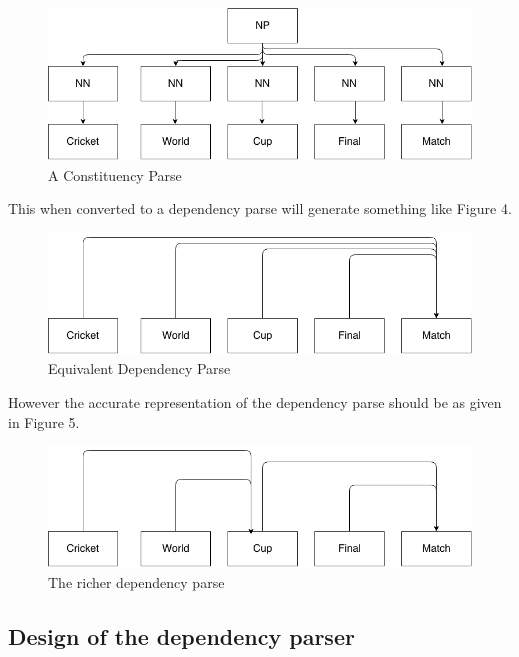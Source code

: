 \begin{enumerate}
\begin{figure}[t]
\centering
\includegraphics[scale=0.4]{gfx/parse.png}
\caption{A Constituency Parse }
\end{figure}
\vspace{8mm}
This when converted to a dependency parse will generate something like Figure 4.
\begin{figure}[t]
\centering
\includegraphics[scale=0.4]{gfx/parse2.png}
\caption{Equivalent Dependency Parse }
\end{figure}

 \vspace{8mm}
 
 However the accurate representation of the dependency parse should be as given in Figure 5.
 
 \begin{figure}[t]
\centering
\includegraphics[scale=0.4]{gfx/parse3.png}
\caption{The richer dependency parse }
\end{figure}
 
\end{enumerate}

\subsection{Design of the dependency parser}

